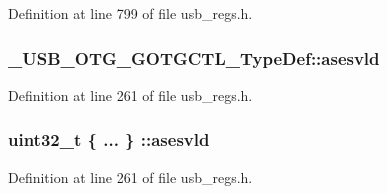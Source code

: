 Definition at line 799 of file usb\-\_\-regs.\-h.

\hypertarget{group___u_s_b___o_t_g___d_r_i_v_e_r_gad7e69d077d4bafb6706e8ffab731a615}{
\subsubsection[{asesvld}]{ \-\_\-\-U\-S\-B\-\_\-\-O\-T\-G\-\_\-\-G\-O\-T\-G\-C\-T\-L\-\_\-\-Type\-Def\-::asesvld}}\label{group___u_s_b___o_t_g___d_r_i_v_e_r_gad7e69d077d4bafb6706e8ffab731a615}


Definition at line 261 of file usb\-\_\-regs.\-h.

\hypertarget{group___u_s_b___o_t_g___d_r_i_v_e_r_ga112fd01b1259985164d4e01edb0abf9e}{
\subsubsection[{asesvld}]{\setlength{\rightskip}{0pt plus 5cm}uint32\-\_\-t \{ ... \} \-::asesvld}}\label{group___u_s_b___o_t_g___d_r_i_v_e_r_ga112fd01b1259985164d4e01edb0abf9e}


Definition at line 261 of file usb\-\_\-regs.\-h.

